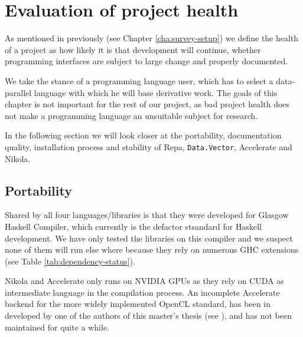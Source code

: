 \chapter{Evaluation of project health}
\label{chap:project-health}


As mentioned in previously (see Chapter
\ref{cha:survey-setup}) we define the health of a project as
how likely it is that development will continue, whether programming
interfaces are subject to large change and properly documented.


We take the stance of a programming language user, which has to select
a data-parallel language with which he will base derivative work. The
goals of this chapter is not important for the rest of our project, as
bad project health does not make a programming language an unsuitable
subject for research.

In the following section we will look closer at the portability,
documentation quality, installation process and stability of Repa,
\lstinline{Data.Vector}, Accelerate and Nikola.

\section{Portability}
  


Shared by all four languages/libraries is that they were developed for
Glasgow Haskell Compiler, which currently is the defactor stsandard
for Haskell development. We have only tested the libraries on this
compiler and we suspect none of them will run else where because they
rely on numerous GHC extensions (see Table
\ref{tab:dependency-status}).

Nikola and Accelerate only runs on NVIDIA GPUs as they rely on CUDA as
intermediate language in the compilation process. An incomplete
Accelerate backend for the more widely implemented OpenCL standard,
has been in developed by one of the authors of this master's thesis
(see \cite{dybdal2011opencl}), and has not been maintained for quite
a while.

